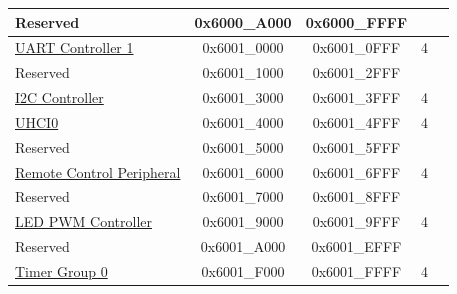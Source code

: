 \begin{longtable}[c]{ |p{5cm}|c|c|r|p{1.0cm}| }
    \rowcolor{gray!25}  Reserved                    & 0x6000\_A000 & 0x6000\_FFFF &         &   \\\hline
                
                        \hyperref[mod:uart]{UART Controller 1}           & 0x6001\_0000 & 0x6001\_0FFF &   4     &   \\\hline
    \rowcolor{gray!25}  Reserved                    & 0x6001\_1000 & 0x6001\_2FFF &         &   \\\hline
                        \hyperref[mod:i2c]{I2C Controller}              & 0x6001\_3000 & 0x6001\_3FFF &   4     &   \\\hline
                        \hyperref[mod:uart]{UHCI0}                       & 0x6001\_4000 & 0x6001\_4FFF &   4     &   \\\hline
    \rowcolor{gray!25}  Reserved                    & 0x6001\_5000 & 0x6001\_5FFF &         &   \\\hline
                        \hyperref[mod:rmt]{Remote Control Peripheral}   & 0x6001\_6000 & 0x6001\_6FFF &   4     &   \\\hline
    \rowcolor{gray!25}  Reserved                    & 0x6001\_7000 & 0x6001\_8FFF &         &   \\\hline
                        \hyperref[mod:ledpwm]{LED PWM Controller}          & 0x6001\_9000 & 0x6001\_9FFF &   4     &   \\\hline
    \rowcolor{gray!25}  Reserved                    & 0x6001\_A000 & 0x6001\_EFFF &         &   \\\hline
                        \hyperref[mod:timg]{Timer Group 0}               & 0x6001\_F000 & 0x6001\_FFFF &   4     &   \\\hline
                        

\end{longtable}
